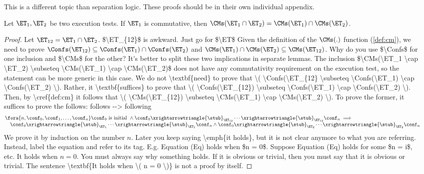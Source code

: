 \ac{This is a different topic than separation logic. These 
proofs should be in their own individual appendix.}

\begin{theorem}
\label{thm:appendix-et-composition-1}
Let $\ET_1, \ET_2$ be two execution tests. If $\ET_1$ is commutative, 
then $\CMs(\ET_1 \cap \ET_2) = \CMs(\ET_1) \cap \CMs(\ET_2)$. 
\end{theorem}
\begin{proof}
Let \( \ET_{12} = \ET_1 \cap \ET_2 \).
\ac{$\ET_{12}$ is awkward. Just go for $\ET$}
Given the definition of the \( \CMs(.) \) function (\cref{def:cm}), we need to prove \( \Confs(\ET_{12}) \subseteq \Confs(\ET_1) \cap \Confs(\ET_2) \) and \( \CMs(\ET_1) \cap \CMs(\ET_2) \subseteq \CMs(\ET_{12}) \).
\ac{Why do you use $\Confs$ for one inclusion and $\CMs$ for the other? It's better to split these two implications in separate lemmas. 
The inclusion $\CMs(\ET_1 \cap \ET_2) \subseteq \CMs(\ET_1) \cap \CMs(\ET_2)$ does not have any commutativity requirement 
on the execution test, so the statement can be more generic in this case.}
\ac{We do not \textbf{need} to prove that \( \Confs(\ET_{12} \subseteq \Confs(\ET_1) \cap \Confs(\ET_2) \). Rather, 
it \textbf{suffices} to prove that \( \Confs(\ET_{12}) \subseteq \Confs(\ET_1) \cap \Confs(\ET_2) \). Then, by \cref{def:cm} 
it follows that \( \CMs(\ET_{12}) \subseteq \CMs(\ET_1) \cap \CMs(\ET_2) \).}
To prove the former, it suffices to prove the follows:
\ac{follows --> following}
\[
\begin{array}{@{}l}
    \fora{n,\conf_0, \conf_1, \dots, \conf_n} \conf_0 \text{ is initial } 
    \land \conf_0 \xrightarrowtriangle{\stub}_{\ET_{12}} \cdots \xrightarrowtriangle{\stub}_{\ET_{12}} \conf_n \implies {} \\
    \quad \conf_0 \xrightarrowtriangle{\stub}_{\ET_{1}} \cdots \xrightarrowtriangle{\stub}_{\ET_{1}} \conf_n \land \conf_0 \xrightarrowtriangle{\stub}_{\ET_{2}} \cdots \xrightarrowtriangle{\stub}_{\ET_{2}} \conf_n 
\end{array}
\]
We prove it by induction on the number \( n \).
\ac{Later you keep saying \emph{it holds}, but it is not clear anymore to what you are referring. Instead, 
label the equation and refer to its tag. E.g. Equation (Eq) holds when $n = 0$. Suppose Equation (Eq) 
holds for some $n = i$, etc.}
It holds when \( n = 0 \). 
\ac{You must always say why something holds. If it is obvious or trivial, then you must say that it is obvious or trivial. 
The sentence \textbf{It holds when \( n = 0 \)} is not a proof by itself.}

\end{proof}
